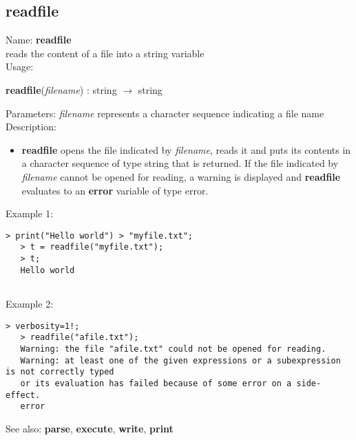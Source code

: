 \subsection{ readfile }
\noindent Name: \textbf{readfile}\\
reads the content of a file into a string variable\\

\noindent Usage: 
\begin{center}
\textbf{readfile}(\emph{filename}) : \textsf{string} $\rightarrow$ \textsf{string}\\
\end{center}
Parameters: 
\emph{filename} represents a character sequence indicating a file name\\

\noindent Description: \begin{itemize}

\item \textbf{readfile} opens the file indicated by \emph{filename}, reads it and puts its
   contents in a character sequence of type \textsf{string} that is returned.
   If the file indicated by \emph{filename} cannot be opened for reading, a
   warning is displayed and \textbf{readfile} evaluates to an \textbf{error} variable of
   type \textsf{error}.
\end{itemize}
\noindent Example 1: 
\begin{center}\begin{minipage}{14.8cm}\begin{Verbatim}[frame=single]
   > print("Hello world") > "myfile.txt";
   > t = readfile("myfile.txt"); 
   > t;
   Hello world
   
\end{Verbatim}
\end{minipage}\end{center}
\noindent Example 2: 
\begin{center}\begin{minipage}{14.8cm}\begin{Verbatim}[frame=single]
   > verbosity=1!;
   > readfile("afile.txt");
   Warning: the file "afile.txt" could not be opened for reading.
   Warning: at least one of the given expressions or a subexpression is not correctly typed
   or its evaluation has failed because of some error on a side-effect.
   error
\end{Verbatim}
\end{minipage}\end{center}
See also: \textbf{parse}, \textbf{execute}, \textbf{write}, \textbf{print}
